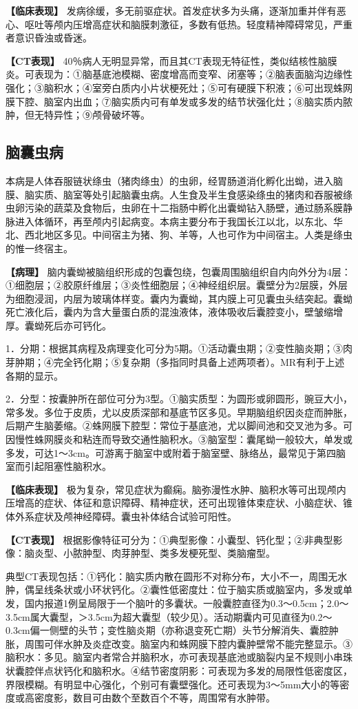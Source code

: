 \textbf{【临床表现】}
发病徐缓，多无前驱症状。首发症状多为头痛，逐渐加重并伴有恶心、呕吐等颅内压增高症状和脑膜刺激征，多数有低热。轻度精神障碍常见，严重者意识昏浊或昏迷。

\textbf{【CT表现】}
40％病人无明显异常，而且其CT表现无特征性，类似结核性脑膜炎。可表现为：①脑基底池模糊、密度增高而变窄、闭塞等；②脑表面脑沟边缘性强化；③脑积水；④室旁白质内小片状梗死灶；⑤可有硬膜下积液；⑥可出现蛛网膜下腔、脑室内出血；⑦脑实质内可有单发或多发的结节状强化灶；⑧脑实质内脓肿，但无特异性；⑨颅骨破坏等。

\subsection{脑囊虫病}

本病是人体吞服链状绦虫（猪肉绦虫）的虫卵，经胃肠道消化孵化出蚴，进入脑膜、脑实质、脑室等处引起脑囊虫病。人生食及半生食感染绦虫的猪肉和吞服被绦虫卵污染的蔬菜及食物后，虫卵在十二指肠中孵化出囊蚴钻入肠壁，通过肠系膜静脉进入体循环，再至颅内引起病变。本病主要分布于我国长江以北，以东北、华北、西北地区多见。中间宿主为猪、狗、羊等，人也可作为中间宿主。人类是绦虫的惟一终宿主。

\textbf{【病理】}
脑内囊蚴被脑组织形成的包囊包绕，包囊周围脑组织自内向外分为4层：①细胞层；②胶原纤维层；③炎性细胞层；④神经组织层。囊壁分为2层膜，外层为细胞浸润，内层为玻璃体样变。囊内为囊蚴，其内膜上可见囊虫头结突起。囊蚴死亡液化后，囊内为含大量蛋白质的混浊液体，液体吸收后囊腔变小，壁皱缩增厚。囊蚴死后亦可钙化。

1．分期：根据其病程及病理变化可分为5期。①活动囊虫期；②变性脑炎期；③肉芽肿期；④完全钙化期；⑤复杂期（多指同时具备上述两项者）。MR有利于上述各期的显示。

2．分型：按囊肿所在部位可分为3型。①脑实质型：为圆形或卵圆形，豌豆大小，常多发。多位于皮质，尤以皮质深部和基底节区多见。早期脑组织因炎症而肿胀，后期产生脑萎缩。②蛛网膜下腔型：常位于基底池，尤以脚间池和交叉池为多。可因慢性蛛网膜炎和粘连而导致交通性脑积水。③脑室型：囊尾蚴一般较大，单发或多发，可达1～3cm。可游离于脑室中或附着于脑室壁、脉络丛，最常见于第四脑室而引起阻塞性脑积水。

\textbf{【临床表现】}
极为复杂，常见症状为癫痫。脑弥漫性水肿、脑积水等可出现颅内压增高的症状、体征和意识障碍、精神症状，还可出现锥体束症状、小脑症状、锥体外系症状及颅神经障碍。囊虫补体结合试验可阳性。

\textbf{【CT表现】}
根据影像特征可分为：①典型影像：小囊型、钙化型；②非典型影像：脑炎型、小脓肿型、肉芽肿型、类多发梗死型、类脑瘤型。

典型CT表现包括：①钙化：脑实质内散在圆形不对称分布，大小不一，周围无水肿，偶呈线条状或小环状钙化。②囊性低密度灶：位于脑实质或脑室内，多发或单发，国内报道1例呈局限于一个脑叶的多囊状。一般囊腔直径为0.3～0.5cm；2.0～3.5cm属大囊型，＞3.5cm为超大囊型（较少见）。活动期囊内可见直径为0.2～0.3cm偏一侧壁的头节；变性脑炎期（亦称退变死亡期）头节分解消失、囊腔肿胀，周围可伴水肿及炎症改变。脑室内和蛛网膜下腔内囊肿壁常不能完整显示。③脑积水：多见。脑室内者常合并脑积水，亦可表现基底池或脑裂内呈不规则小串珠状囊腔伴点状钙化和脑积水。④结节密度阴影：可表现为多发的局限性低密度区，界限模糊。有明显中心强化，个别可有囊壁强化。还可表现为3～5mm大小的等密度或高密度影，数目可由数个至数百个不等，周围常有水肿带。

